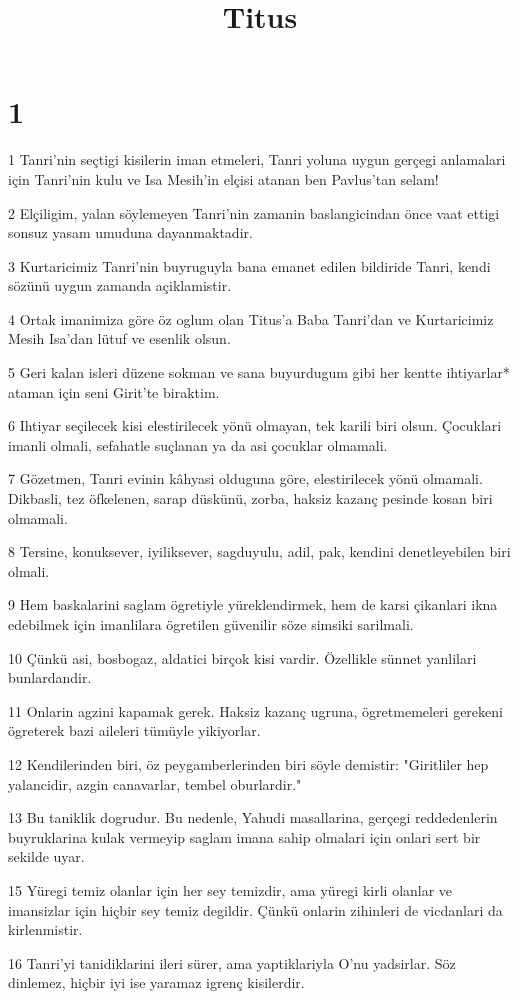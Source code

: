 

\title{Titus}


\chapter{1}

\par 1 Tanri'nin seçtigi kisilerin iman etmeleri, Tanri yoluna uygun gerçegi anlamalari için Tanri'nin kulu ve Isa Mesih'in elçisi atanan ben Pavlus'tan selam!
\par 2 Elçiligim, yalan söylemeyen Tanri'nin zamanin baslangicindan önce vaat ettigi sonsuz yasam umuduna dayanmaktadir.
\par 3 Kurtaricimiz Tanri'nin buyruguyla bana emanet edilen bildiride Tanri, kendi sözünü uygun zamanda açiklamistir.
\par 4 Ortak imanimiza göre öz oglum olan Titus'a Baba Tanri'dan ve Kurtaricimiz Mesih Isa'dan lütuf ve esenlik olsun.
\par 5 Geri kalan isleri düzene sokman ve sana buyurdugum gibi her kentte ihtiyarlar* ataman için seni Girit'te biraktim.
\par 6 Ihtiyar seçilecek kisi elestirilecek yönü olmayan, tek karili biri olsun. Çocuklari imanli olmali, sefahatle suçlanan ya da asi çocuklar olmamali.
\par 7 Gözetmen, Tanri evinin kâhyasi olduguna göre, elestirilecek yönü olmamali. Dikbasli, tez öfkelenen, sarap düskünü, zorba, haksiz kazanç pesinde kosan biri olmamali.
\par 8 Tersine, konuksever, iyiliksever, sagduyulu, adil, pak, kendini denetleyebilen biri olmali.
\par 9 Hem baskalarini saglam ögretiyle yüreklendirmek, hem de karsi çikanlari ikna edebilmek için imanlilara ögretilen güvenilir söze simsiki sarilmali.
\par 10 Çünkü asi, bosbogaz, aldatici birçok kisi vardir. Özellikle sünnet yanlilari bunlardandir.
\par 11 Onlarin agzini kapamak gerek. Haksiz kazanç ugruna, ögretmemeleri gerekeni ögreterek bazi aileleri tümüyle yikiyorlar.
\par 12 Kendilerinden biri, öz peygamberlerinden biri söyle demistir: "Giritliler hep yalancidir, azgin canavarlar, tembel oburlardir."
\par 13 Bu taniklik dogrudur. Bu nedenle, Yahudi masallarina, gerçegi reddedenlerin buyruklarina kulak vermeyip saglam imana sahip olmalari için onlari sert bir sekilde uyar.
\par 15 Yüregi temiz olanlar için her sey temizdir, ama yüregi kirli olanlar ve imansizlar için hiçbir sey temiz degildir. Çünkü onlarin zihinleri de vicdanlari da kirlenmistir.
\par 16 Tanri'yi tanidiklarini ileri sürer, ama yaptiklariyla O'nu yadsirlar. Söz dinlemez, hiçbir iyi ise yaramaz igrenç kisilerdir.

